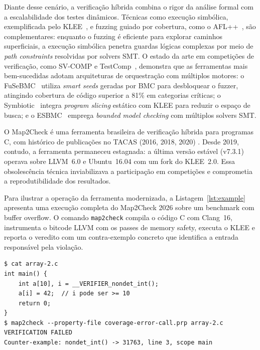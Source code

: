\documentclass[12pt]{article}
\begin{document}
Diante desse cenário, a verificação híbrida combina o rigor da análise formal com a escalabilidade dos testes dinâmicos. Técnicas como execução simbólica, exemplificada pelo KLEE~\cite{klee2008}, e fuzzing guiado por cobertura, como o AFL++~\cite{fioraldi2020aflpp}, são complementares: enquanto o fuzzing é
eficiente para explorar caminhos superficiais, a execução simbólica penetra guardas lógicas complexas por meio de \textit{path constraints} resolvidas por solvers SMT. O estado da arte em competições de verificação, como SV-COMP e TestComp~\cite{beyersvcomp2013,beyertestcomp2023}, demonstra que as
ferramentas mais bem-sucedidas adotam arquiteturas de orquestração com múltiplos motores: o FuSeBMC~\cite{fusebmc2022} utiliza \textit{smart seeds} geradas por BMC para desbloquear o fuzzer, atingindo cobertura de código superior a 81\% em categorias críticas; o Symbiotic~\cite{chalupa2021symbiotic} integra \textit{program slicing} estático com KLEE para reduzir o espaço de busca; e o ESBMC~\cite{gadelha2021esbmc} emprega \textit{bounded model checking} com múltiplos solvers SMT.

O Map2Check é uma ferramenta brasileira de verificação híbrida para programas C, com histórico de publicações no TACAS (2016, 2018, 2020) \cite{map2check2018,map2check2020}. Desde 2019, contudo, a ferramenta permaneceu estagnada: a última versão estável (v7.3.1) operava sobre LLVM~6.0 e Ubuntu~16.04 com um fork do KLEE~2.0. Essa obsolescência técnica inviabilizava a participação em competições e
comprometia a reprodutibilidade dos resultados.

Para ilustrar a operação da ferramenta modernizada, a Listagem~\ref{lst:example} apresenta uma execução completa do Map2Check 2026 sobre um benchmark com buffer overflow. O comando \texttt{map2check} compila o código C com Clang~16, instrumenta o bitcode LLVM com os passes de memory safety, executa o KLEE e reporta o veredito com um contra-exemplo concreto que identifica a entrada responsável pela violação.

\begin{lstlisting}[caption={Execução do Map2Check em um cenário de buffer overflow.}, label=lst:example, basicstyle=\ttfamily\small]
$ cat array-2.c
int main() {
    int a[10], i = __VERIFIER_nondet_int();
    a[i] = 42;  // i pode ser >= 10
    return 0;
}
$ map2check --property-file coverage-error-call.prp array-2.c
VERIFICATION FAILED
Counter-example: nondet_int() -> 31763, line 3, scope main
\end{lstlisting}
\end{document}
